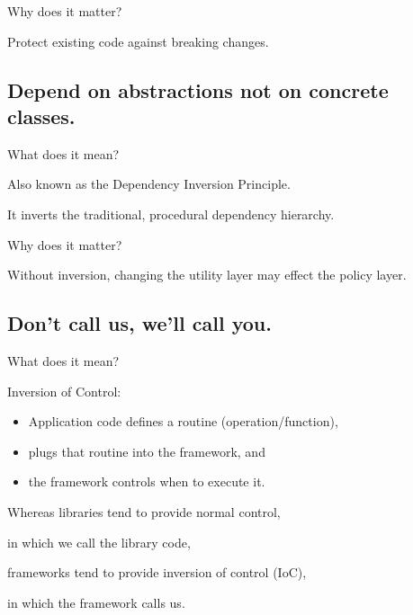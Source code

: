 \documentclass{beamer}
\begin{document}
\begin{frame}{Why does it matter?}
    \par Protect existing code against breaking changes.
\end{frame}

\begin{frame}{}
    
\end{frame}

\begin{frame}{}
    
\end{frame}

\subsection{Depend on abstractions not on concrete classes.}

\begin{frame}{What does it mean?}
    \par Also known as the Dependency Inversion Principle.
    \par It inverts the traditional, procedural dependency hierarchy.
\end{frame}

\begin{frame}{Why does it matter?}
    \par Without inversion, changing the utility layer may effect the policy layer. 
\end{frame}

\begin{frame}{}
    
\end{frame}

\begin{frame}{}
    
\end{frame}

\subsection{Don't call us, we'll call you.}

\begin{frame}{What does it mean?}
    \par Inversion of Control: 
    \begin{itemize}
        \item Application code defines a routine (operation/function),
        \item plugs that routine into the framework, and 
        \item the framework controls when to execute it.
    \end{itemize}
    \par Whereas libraries tend to provide normal control, 
    \par in which we call the library code,
    \par frameworks tend to provide inversion of control (IoC),
    \par in which the framework calls us.
\end{frame}
\end{document}
